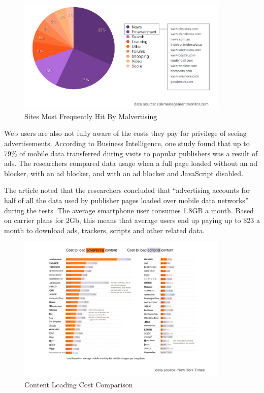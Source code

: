 \documentclass[11pt]{article}
\begin{document}
\begin{figure}
\begin{center}
\includegraphics[width=0.9\textwidth]{hitbymalvertising.png}
\caption{Sites Most Frequently Hit By Malvertising}
\end{center}
\end{figure}


Web users are also not fully aware of the costs they pay for privilege of seeing advertisements. According to Business Intelligence, one study found that up to 79\% of mobile data transferred during visits to popular publishers was a result of ads. The researchers compared data usage when a full page loaded without an ad blocker, with an ad blocker, and with an ad blocker and JavaScript disabled.


The article noted that the researchers concluded that ``advertising accounts for half of all the data used by publisher pages loaded over mobile data networks'' during the tests. The average smartphone user consumes 1.8GB a month. Based on carrier plans for 2Gb, this means that average users end up paying up to \$23 a month to download ads, trackers, scripts and other related data.\cite{9}


\begin{figure}
\begin{center}
\includegraphics[width=0.9\textwidth]{cost_to_load_ads.png}
\caption{Content Loading Cost Comparison}
\end{center}
\end{figure}
\end{document}
